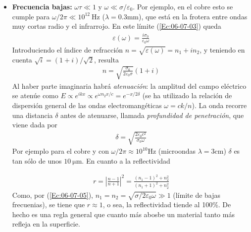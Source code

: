 \begin{itemize}
	\item \textbf{Frecuencia bajas:} $\omega \tau \ll 1$ y $\omega \ll \sigma / \varepsilon_0$. Por ejemplo, en el cobre esto se cumple para $\omega/2\pi\ll 10^{12} \ \unit{\Hz}$ ($\lambda = 0.3\unit{\mm}$), que está en la frotera entre ondas muy cortas radio y el infrarrojo. En este límite (\ref{Ec:06-07-03}) queda 
	\begin{eqnarray}
		\varepsilon(\omega) = \frac{i\sigma_0}{\varepsilon_0 \omega}
	\end{eqnarray}
	Introduciendo el índice de refracción $n=\sqrt{\varepsilon(\omega)}=n_1 + i n_2$, y teniendo en cuenta $\sqrt{i}=(1+i)/\sqrt{2}$, resulta
	\begin{eqnarray}
		n = \sqrt{\frac{\sigma_0}{2\varepsilon_0\sigma}} (1+i) \label{Ec:06-07-05}
	\end{eqnarray}
	Al haber parte imaginaria habrá \textit{atenuación}: la amplitud del campo eléctrico se atenúe como $E\propto e^{ikx} \propto e^{\omega n_2 x/c} = e^{-x/2\delta}$ (se ha utilizado la relación de dispersión general de las ondas electromangéticas $\omega = ck /n$). La onda recorre una distancia $\delta$ antes de atenuarse, llamada \textit{profundidad de penetración}, que viene dada por 
	\begin{eqnarray}
		\delta = \sqrt{\frac{2\varepsilon_0 c^2}{\sigma_0 \omega}}
	\end{eqnarray}
	Por ejemplo para el cobre y con $\omega/2\pi \approx 10^{10} \unit{\Hz}$ (microondas $\lambda=3\unit{\cm}$) $\delta$ es tan sólo de unos $10 \ \unit{\um}$. En cuanto a la reflectividad 

	\begin{eqnarray}
		r = \left| \frac{n-1}{n+1} \right|^2 = \frac{(n_1-1)^2 + n_2^2}{(n_1+1)^2+n_2^2} \label{Ec:06-07-07}
	\end{eqnarray}
	Como, por (\ref{Ec:06-07-05}), $n_1 = n_2 = \sqrt{\sigma / 2\varepsilon_0 \omega} \gg 1$ (límite de bajas frecuenias), se tiene que $r\approx 1$, o sea, la reflectividad tiende al 100\%. De hecho es una regla general que cuanto más abosbe un material tanto más refleja en la superficie.


\end{itemize}

